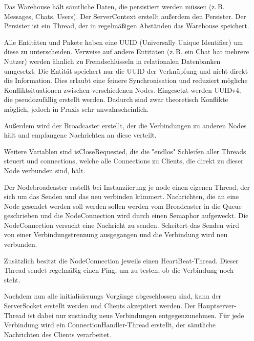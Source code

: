 Das Warehouse hält sämtliche Daten, die persistiert werden müssen (z.\,B. Messages, Chats, Users). Der ServerContext erstellt außerdem den Persister. Der Persister ist ein Thread, der in regelmäßigen Abständen das Warehouse speichert.


Alle Entitäten und Pakete haben eine UUID (Universally Unique Identifier) um diese zu unterscheiden. Verweise auf andere Entitäten (z.\,B. ein Chat hat mehrere Nutzer) werden ähnlich zu Fremdschlüsseln in relationalen Datenbanken umgesetzt. Die Entität speichert nur die UUID der Verknüpfung und nicht direkt die Information. Dies erlaubt eine feinere Synchronisation und reduziert mögliche Konfliktsituationen zwischen verschiedenen Nodes. Eingesetzt werden UUIDv4, die pseudozufällig erstellt werden. Dadurch sind zwar theoretisch Konflikte möglich, jedoch in Praxis sehr unwahrscheinlich.

Außerdem wird der Broadcaster erstellt, der die Verbindungen zu anderen Nodes hält und empfangene Nachrichten an diese verteilt.




Weitere Variablen sind isCloseRequested, die die "endlos" Schleifen aller Threads steuert und connections, welche alle Connections zu Clients, die direkt zu dieser Node verbunden sind, hält.

Der Nodebroadcaster erstellt bei Instanziierung je node einen eigenen Thread, der sich um das Senden und das neu verbinden kümmert.
Nachrichten, die an eine Node gesendet werden soll werden sollen werden vom Broadcaster in die Queue geschrieben und die NodeConnection wird durch einen Semaphor aufgeweckt. 
Die NodeConnection versucht eine Nachricht zu senden. Scheitert das Senden wird von einer Verbindungstrennung ausgegangen und die Verbindung wird neu verbunden.


Zusätzlich besitzt die NodeConnection jeweils einen HeartBeat-Thread. Dieser Thread sendet regelmäßig einen Ping, um zu testen, ob die Verbindung noch steht.


Nachdem nun alle initialisierungs Vorgänge abgeschlossen sind, kann der ServerSocket erstellt werden und Clients akzeptiert werden.
Der Hauptserver-Thread ist dabei nur zuständig neue Verbindungen entgegenzunehmen. Für jede Verbindung wird ein ConnectionHandler-Thread erstellt, der sämtliche Nachrichten des Clients verarbeitet.


